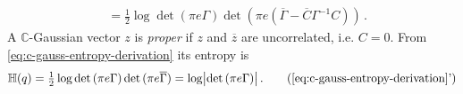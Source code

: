 \documentclass[a4paper,10pt]{article}
\newcommand{\cplx}{\mathbb{C}}
\newcommand{\conj}[1]{\overline{#1}}
\begin{document}
\begin{align}
    &
    = \tfrac12 \log \det{(\pi e \Gamma)}
      \det{(\pi e (\conj{\Gamma} - \conj{C} \Gamma^{-1} C))}
    \,.
\end{align}
A $\cplx$-Gaussian vector $z$ is \textit{proper} if $z$ and $\conj{z}$ are uncorrelated, i.e.
$C = 0$. From \eqref{eq:c-gauss-entropy-derivation} its entropy is
\begin{equation}  \label{eq:cn-proper-entropy}
  \mathbb{H}(q)
    = \tfrac12 \log \det{(\pi e \Gamma)} \det{(\pi e \conj{\Gamma})}
    = \log \bigl\lvert \det{(\pi e \Gamma)} \bigr\rvert
    \,.
    \tag{\ref{eq:c-gauss-entropy-derivation}'}
\end{equation}
%
\end{document}
